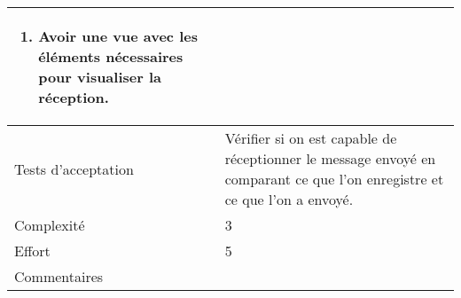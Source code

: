\begin{longtable}{|l|p{}|}
\begin{enumerate}[label*=\arabic*.]
\begin{enumerate}[label*=\arabic*.]
\begin{enumerate}[label*=\arabic*.]
                        \item Avoir une vue avec les éléments nécessaires pour visualiser la réception.
                    \end{enumerate}
                \end{enumerate}
        \end{enumerate} \\
\hline
    Tests d'acceptation & Vérifier si on est capable de réceptionner le message envoyé en comparant ce que l'on enregistre et ce que l'on a envoyé.\\

\hline
    Complexité & 3 \\
\hline
    Effort & 5 \\
\hline
    Commentaires & \\


\end{longtable}
